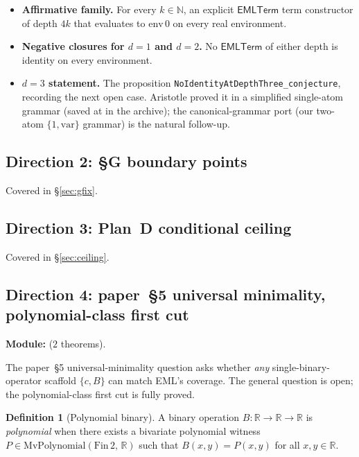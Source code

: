 \documentclass[11pt,a4paper]{article}
\theoremstyle{plain}
\theoremstyle{definition}
\newtheorem{definition}[theorem]{Definition}
\newcommand{\R}{\mathbb{R}}
\newcommand{\N}{\mathbb{N}}
\newcommand{\EMLT}{\mathsf{EMLTerm}}
\begin{document}
\begin{itemize}[topsep=2pt, itemsep=2pt]
  \item \textbf{Affirmative family.} For every $k \in \N$, an
    explicit $\EMLT$ term constructor of depth $4k$ that evaluates to
    $\mathrm{env}\,0$ on every real environment.
  \item \textbf{Negative closures for $d = 1$ and $d = 2$.} No
    $\EMLT$ of either depth is identity on every environment.
  \item \textbf{$d = 3$ statement.} The proposition
    \texttt{NoIdentityAtDepthThree\_conjecture}, recording the next
    open case. Aristotle proved it in a simplified single-atom
    grammar (saved at
     in the
    archive);
    the canonical-grammar port (our two-atom $\{1, \mathrm{var}\}$
    grammar) is the natural follow-up.
\end{itemize}

\subsection{Direction 2: §G boundary points}

Covered in \S\ref{sec:gfix}.

\subsection{Direction 3: Plan~D conditional ceiling}

Covered in \S\ref{sec:ceiling}.

\subsection{Direction 4: paper~§5 universal minimality,
polynomial-class first cut}

\noindent\textbf{Module:} 
($2$ theorems).

The paper~§5 universal-minimality question asks whether \emph{any}
single-binary-operator scaffold $\{c, B\}$ can match EML's coverage.
The general question is open; the polynomial-class first cut is
fully proved.

\begin{definition}[Polynomial binary]
A binary operation $B \colon \R \to \R \to \R$ is \emph{polynomial}
when there exists a bivariate polynomial witness
$P \in \mathrm{MvPolynomial}(\mathrm{Fin}\,2,\,\R)$ such that
$B(x, y) = P(x, y)$ for all $x, y \in \R$.
\end{definition}
\end{document}
